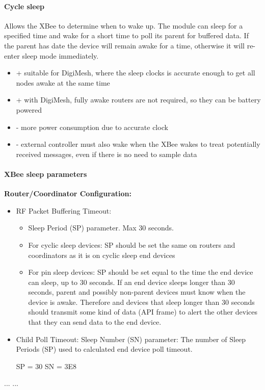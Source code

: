 \paragraph{Cycle sleep}
Allows the XBee to determine when to wake up. The module can sleep for a specified time and wake for a short time to poll its parent for buffered data. If the parent has date the device will remain awake for a time, otherwise it will re-enter sleep mode immediately. 
\begin{itemize}
\item + suitable for DigiMesh, where the sleep clocks is accurate enough to get all nodes awake at the same time
\item + with DigiMesh, fully awake routers are not required, so they can be battery powered
\item - more power consumption due to accurate clock
\item - external controller must also wake when the XBee wakes to treat potentially received messages, even if there is no need to sample data
\end{itemize}

\paragraph{XBee sleep parameters}
\textbf{Router/Coordinator Configuration:} 
\begin{itemize}
\item RF Packet Buffering Timeout: 
\begin{itemize}
\item Sleep Period (SP) parameter. Max 30 seconds.
\item For cyclic sleep devices: SP should be set the same on routers and coordinators as it is on cyclic sleep end devices
\item For pin sleep devices: SP should be set equal to the time the end device can sleep, up to 30 seconds. If an end device sleeps longer than 30 seconds, parent and possibly non-parent devices must know when the device is awake. Therefore and devices that sleep longer than 30 seconds should transmit some kind of data (API frame) to alert the other devices that they can send data to the end device.
\end{itemize}
\item Child Poll Timeout: Sleep Number (SN) parameter: The number of Sleep Periods (SP) used to calculated end device poll timeout.

SP = 30
SN = 3E8
\end{itemize}
... ...

